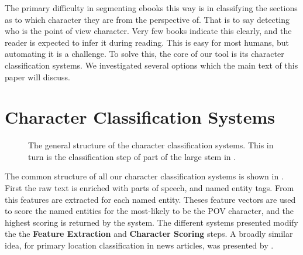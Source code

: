 \documentclass[11pt,a4paper]{article}
\newcommand{\textcite}{\cite}
\begin{document}
The primary difficulty in segmenting ebooks this way is in classifying the sections as to which character they are from the perspective of.
That is to say detecting who is the point of view character.
Very few books indicate this clearly, and the reader is expected to infer it during reading.
This is easy for most humans, but automating it is a challenge.
To solve this, the core of our tool is its character classification systems.
We investigated several options which the main text of this paper will discuss.


\section{Character Classification Systems}
\begin{figure*}
	\caption{The general structure of the character classification systems. This in turn is the classification step of part of the large stem in . \label{fig:classify}}
\end{figure*}
The common structure of all our character classification systems is shown in .
First the raw text is enriched with parts of speech, and named entity tags.
From this features are extracted for each named entity.
Theses feature vectors are used to score the named entities for the most-likely to be the POV character, and the highest scoring is returned by the system.
The different systems presented modify the the \textbf{Feature Extraction} and \textbf{Character Scoring} steps.
A broadly similar idea, for primary location classification in news articles, was presented by \textcite{2017focus}.
\end{document}
